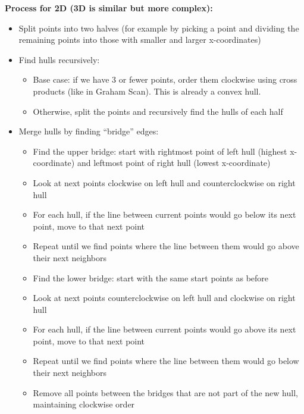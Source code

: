 \documentclass[11pt,a4paper]{article}
\begin{document}
\begin{multicols}{2}
\textbf{Process for 2D (3D is similar but more complex):}
\begin{itemize}
    \item Split points into two halves (for example by picking a point and dividing the remaining points into those with smaller and larger x-coordinates)
    \item Find hulls recursively:
    \begin{itemize}
        \item Base case: if we have 3 or fewer points, order them clockwise using cross products (like in Graham Scan). This is already a convex hull.
        \item Otherwise, split the points and recursively find the hulls of each half
    \end{itemize}
    \item Merge hulls by finding ``bridge'' edges:
    \begin{itemize}
        \item Find the upper bridge: start with rightmost point of left hull (highest x-coordinate) and leftmost point of right hull (lowest x-coordinate)
        \item Look at next points clockwise on left hull and counterclockwise on right hull
        \item For each hull, if the line between current points would go below its next point, move to that next point
        \item Repeat until we find points where the line between them would go above their next neighbors
        \item Find the lower bridge: start with the same start points as before
        \item Look at next points counterclockwise on left hull and clockwise on right hull
        \item For each hull, if the line between current points would go above its next point, move to that next point
        \item Repeat until we find points where the line between them would go below their next neighbors
        \item Remove all points between the bridges that are not part of the new hull, maintaining clockwise order
    \end{itemize}
\end{itemize}


\end{multicols}
\end{document}
